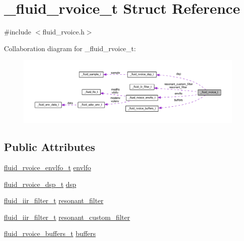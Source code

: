 \hypertarget{struct__fluid__rvoice__t}{}\section{\+\_\+fluid\+\_\+rvoice\+\_\+t Struct Reference}
\label{struct__fluid__rvoice__t}


{\ttfamily \#include $<$fluid\+\_\+rvoice.\+h$>$}



Collaboration diagram for \+\_\+fluid\+\_\+rvoice\+\_\+t\+:
\nopagebreak
\begin{figure}[H]
\begin{center}
\leavevmode
\includegraphics[width=350pt]{struct__fluid__rvoice__t__coll__graph}
\end{center}
\end{figure}
\subsection*{Public Attributes}
\begin{DoxyCompactItemize}
\item 
\hyperlink{fluid__rvoice_8h_a292109da8a8c976f672b78e64acbd1b0}{fluid\+\_\+rvoice\+\_\+envlfo\+\_\+t} \hyperlink{struct__fluid__rvoice__t_a16e90dcb076e8f6498c899110af4ae66}{envlfo}
\item 
\hyperlink{fluid__rvoice_8h_abb83d814377cb6bfcb8761325dce7d58}{fluid\+\_\+rvoice\+\_\+dsp\+\_\+t} \hyperlink{struct__fluid__rvoice__t_aa8fc84b1b084b7b2cadeb73e5bff3550}{dsp}
\item 
\hyperlink{fluid__iir__filter_8h_a195102aefee11bb26f43b39ecf86088a}{fluid\+\_\+iir\+\_\+filter\+\_\+t} \hyperlink{struct__fluid__rvoice__t_a70d7bb364e3f986660e569e4656897d9}{resonant\+\_\+filter}
\item 
\hyperlink{fluid__iir__filter_8h_a195102aefee11bb26f43b39ecf86088a}{fluid\+\_\+iir\+\_\+filter\+\_\+t} \hyperlink{struct__fluid__rvoice__t_acb337f7b611f399554d63516fbe07c33}{resonant\+\_\+custom\+\_\+filter}
\item 
\hyperlink{fluid__rvoice_8h_a4fc5c15c3ffacb81fdae6583648e6461}{fluid\+\_\+rvoice\+\_\+buffers\+\_\+t} \hyperlink{struct__fluid__rvoice__t_a1f4154f8df5e5a7e49770d542fd0014b}{buffers}
\end{DoxyCompactItemize}


